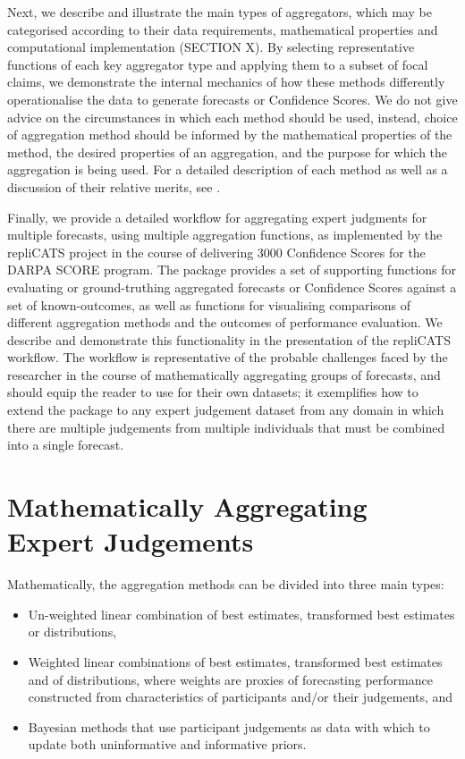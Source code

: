 \documentclass[article]{jss}
\begin{document}
Next, we describe and illustrate the main types of aggregators, which
may be categorised according to their data requirements, mathematical
properties and computational implementation (SECTION X). By selecting
representative functions of each key aggregator type and applying them
to a subset of focal claims, we demonstrate the internal mechanics of
how these methods differently operationalise the data to generate
forecasts or Confidence Scores. We do not give advice on the
circumstances in which each method should be used, instead, choice of
aggregation method should be informed by the mathematical properties of
the method, the desired properties of an aggregation, and the purpose
for which the aggregation is being used. For a detailed description of
each method as well as a discussion of their relative merits, see
\citep{Hanea2021}.

Finally, we provide a detailed workflow for aggregating expert judgments
for multiple forecasts, using multiple aggregation functions, as
implemented by the repliCATS project in the course of delivering 3000
Confidence Scores for the DARPA SCORE program. The 
package provides a set of supporting functions for evaluating or
ground-truthing aggregated forecasts or Confidence Scores against a set
of known-outcomes, as well as functions for visualising comparisons of
different aggregation methods and the outcomes of performance
evaluation. We describe and demonstrate this functionality in the
presentation of the repliCATS workflow. The workflow is representative
of the probable challenges faced by the researcher in the course of
mathematically aggregating groups of forecasts, and should equip the
reader to use  for their own datasets; it exemplifies how
to extend the  package to any expert judgement dataset
from any domain in which there are multiple judgements from multiple
individuals that must be combined into a single forecast.

\hypertarget{mathematically-aggregating-expert-judgements}{%
\section{Mathematically Aggregating Expert
Judgements}\label{mathematically-aggregating-expert-judgements}}

Mathematically, the aggregation methods can be divided into three main
types:

\begin{itemize}
\item
  Un-weighted linear combination of best estimates, transformed best
  estimates or distributions,
\item
  Weighted linear combinations of best estimates, transformed best
  estimates and of distributions, where weights are proxies of
  forecasting performance constructed from characteristics of
  participants and/or their judgements, and
\item
  Bayesian methods that use participant judgements as data with which to
  update both uninformative and informative priors.
\end{itemize}
\end{document}
